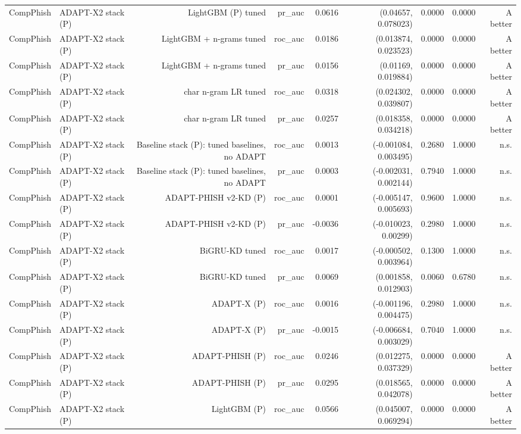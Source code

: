 \begin{table}[t]
\begin{tabular}{llrrrrrrr}
CompPhish & ADAPT-X2 stack (P) & LightGBM (P) tuned & pr\_auc & 0.0616 & (0.04657, 0.078023) & 0.0000 & 0.0000 & A better \\
CompPhish & ADAPT-X2 stack (P) & LightGBM + n-grams tuned & roc\_auc & 0.0186 & (0.013874, 0.023523) & 0.0000 & 0.0000 & A better \\
CompPhish & ADAPT-X2 stack (P) & LightGBM + n-grams tuned & pr\_auc & 0.0156 & (0.01169, 0.019884) & 0.0000 & 0.0000 & A better \\
CompPhish & ADAPT-X2 stack (P) & char n-gram LR tuned & roc\_auc & 0.0318 & (0.024302, 0.039807) & 0.0000 & 0.0000 & A better \\
CompPhish & ADAPT-X2 stack (P) & char n-gram LR tuned & pr\_auc & 0.0257 & (0.018358, 0.034218) & 0.0000 & 0.0000 & A better \\
CompPhish & ADAPT-X2 stack (P) & Baseline stack (P): tuned baselines, no ADAPT & roc\_auc & 0.0013 & (-0.001084, 0.003495) & 0.2680 & 1.0000 & n.s. \\
CompPhish & ADAPT-X2 stack (P) & Baseline stack (P): tuned baselines, no ADAPT & pr\_auc & 0.0003 & (-0.002031, 0.002144) & 0.7940 & 1.0000 & n.s. \\
CompPhish & ADAPT-X2 stack (P) & ADAPT-PHISH v2-KD (P) & roc\_auc & 0.0001 & (-0.005147, 0.005693) & 0.9600 & 1.0000 & n.s. \\
CompPhish & ADAPT-X2 stack (P) & ADAPT-PHISH v2-KD (P) & pr\_auc & -0.0036 & (-0.010023, 0.00299) & 0.2980 & 1.0000 & n.s. \\
CompPhish & ADAPT-X2 stack (P) & BiGRU-KD tuned & roc\_auc & 0.0017 & (-0.000502, 0.003964) & 0.1300 & 1.0000 & n.s. \\
CompPhish & ADAPT-X2 stack (P) & BiGRU-KD tuned & pr\_auc & 0.0069 & (0.001858, 0.012903) & 0.0060 & 0.6780 & n.s. \\
CompPhish & ADAPT-X2 stack (P) & ADAPT-X (P) & roc\_auc & 0.0016 & (-0.001196, 0.004475) & 0.2980 & 1.0000 & n.s. \\
CompPhish & ADAPT-X2 stack (P) & ADAPT-X (P) & pr\_auc & -0.0015 & (-0.006684, 0.003029) & 0.7040 & 1.0000 & n.s. \\
CompPhish & ADAPT-X2 stack (P) & ADAPT-PHISH (P) & roc\_auc & 0.0246 & (0.012275, 0.037329) & 0.0000 & 0.0000 & A better \\
CompPhish & ADAPT-X2 stack (P) & ADAPT-PHISH (P) & pr\_auc & 0.0295 & (0.018565, 0.042078) & 0.0000 & 0.0000 & A better \\
CompPhish & ADAPT-X2 stack (P) & LightGBM (P) & roc\_auc & 0.0566 & (0.045007, 0.069294) & 0.0000 & 0.0000 & A better \\

\end{tabular}
\end{table}

